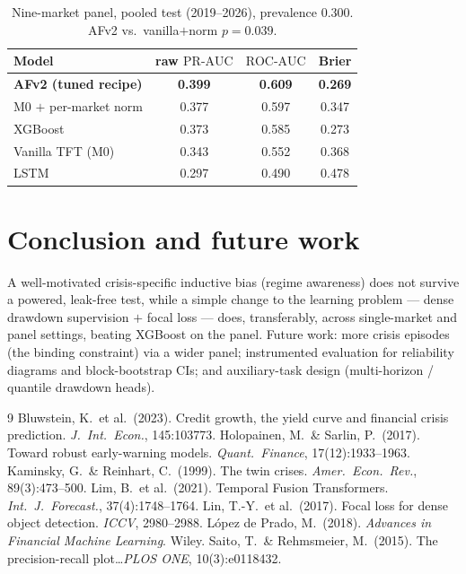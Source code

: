 \documentclass[10pt,a4paper,twocolumn]{article}
\newcommand{\prauc}{\mbox{PR-AUC}}
\newcommand{\rocauc}{\mbox{ROC-AUC}}
\begin{document}
\begin{table}[t]
\centering\footnotesize
\caption{Nine-market panel, pooled test (2019--2026), prevalence $0.300$.
AFv2 vs.\ vanilla$+$norm $p{=}0.039$.}
\label{tab:panel}
\begin{tabular}{lccc}
\toprule
Model & raw $\prauc$ & $\rocauc$ & Brier \\
\midrule
\textbf{AFv2 (tuned recipe)} & \textbf{0.399} & \textbf{0.609} & \textbf{0.269} \\
M0 $+$ per-market norm       & 0.377 & 0.597 & 0.347 \\
XGBoost                      & 0.373 & 0.585 & 0.273 \\
Vanilla TFT (M0)             & 0.343 & 0.552 & 0.368 \\
LSTM                         & 0.297 & 0.490 & 0.478 \\
\bottomrule
\end{tabular}
\end{table}

\section{Conclusion and future work}
A well-motivated crisis-specific inductive bias (regime awareness) does not
survive a powered, leak-free test, while a simple change to the learning
problem --- dense drawdown supervision $+$ focal loss --- does, transferably,
across single-market and panel settings, beating XGBoost on the panel. Future
work: more crisis episodes (the binding constraint) via a wider panel;
instrumented evaluation for reliability diagrams and block-bootstrap CIs; and
auxiliary-task design (multi-horizon / quantile drawdown heads).

\vspace{-2pt}
{\footnotesize

\begin{thebibliography}{9}\setlength{\itemsep}{0pt}\small
{} Bluwstein, K.\ et al.\ (2023). Credit growth, the yield curve and financial crisis prediction. \emph{J.\ Int.\ Econ.}, 145:103773.
 Holopainen, M.\ \& Sarlin, P.\ (2017). Toward robust early-warning models. \emph{Quant.\ Finance}, 17(12):1933--1963.
 Kaminsky, G.\ \& Reinhart, C.\ (1999). The twin crises. \emph{Amer.\ Econ.\ Rev.}, 89(3):473--500.
 Lim, B.\ et al.\ (2021). Temporal Fusion Transformers. \emph{Int.\ J.\ Forecast.}, 37(4):1748--1764.
 Lin, T.-Y.\ et al.\ (2017). Focal loss for dense object detection. \emph{ICCV}, 2980--2988.
 L\'opez de Prado, M.\ (2018). \emph{Advances in Financial Machine Learning}. Wiley.
 Saito, T.\ \& Rehmsmeier, M.\ (2015). The precision-recall plot\dots \emph{PLOS ONE}, 10(3):e0118432.
\end{thebibliography}}
\end{document}
